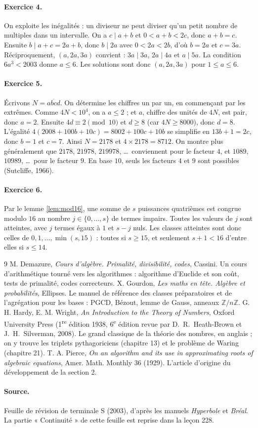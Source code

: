 \documentclass[11pt,a4paper]{article}
\theoremstyle{plain}
\theoremstyle{definition}
\theoremstyle{remark}
\newcommand{\Z}{\mathbb{Z}}
\begin{document}
\paragraph{Exercice 4.} On exploite les inégalités : un diviseur ne peut diviser qu'un petit nombre de multiples dans un intervalle. On a $c\mid a+b$ et $0<a+b<2c$, donc $a+b=c$. Ensuite $b\mid a+c=2a+b$, donc $b\mid2a$ avec $0<2a<2b$, d'où $b=2a$ et $c=3a$. Réciproquement, $(a,2a,3a)$ convient : $3a\mid3a$, $2a\mid4a$ et $a\mid5a$. La condition $6a^3<2003$ donne $a\leq6$. Les solutions sont donc $(a,2a,3a)$ pour $1\leq a\leq6$.

\paragraph{Exercice 5.} Écrivons $N=\overline{abcd}$. On détermine les chiffres un par un, en commençant par les extrêmes. Comme $4N<10^4$, on a $a\leq2$ ; et $a$, chiffre des unités de $4N$, est pair, donc $a=2$. Ensuite $4d\equiv2\pmod{10}$ et $d\geq8$ (car $4N\geq8000$), donc $d=8$. L'égalité $4(2008+100b+10c)=8002+100c+10b$ se simplifie en $13b+1=2c$, donc $b=1$ et $c=7$. Ainsi $N=2178$ et $4\times2178=8712$. On montre plus généralement que $2178$, $21978$, $219978$, \dots\ conviennent pour le facteur $4$, et $1089$, $10989$, \dots\ pour le facteur $9$. En base $10$, seuls les facteurs $4$ et $9$ sont possibles (Sutcliffe, 1966).

\paragraph{Exercice 6.} Par le lemme \ref{lem:mod16}, une somme de $s$ puissances quatrièmes est congrue modulo $16$ au nombre $j\in\{0,\dots,s\}$ de termes impairs. Toutes les valeurs de $j$ sont atteintes, avec $j$ termes égaux à $1$ et $s-j$ nuls. Les classes atteintes sont donc celles de $0,1,\dots,\min(s,15)$ : toutes si $s\geq15$, et seulement $s+1<16$ d'entre elles si $s\leq14$.

\begin{thebibliography}{9}
 M. Demazure, \emph{Cours d'algèbre. Primalité, divisibilité, codes}, Cassini. Un cours d'arithmétique tourné vers les algorithmes : algorithme d'Euclide et son coût, tests de primalité, codes correcteurs.
 X. Gourdon, \emph{Les maths en tête. Algèbre et probabilités}, Ellipses. Le manuel de référence des classes préparatoires et de l'agrégation pour les bases : PGCD, Bézout, lemme de Gauss, anneaux $\Z/n\Z$.
 G. H. Hardy, E. M. Wright, \emph{An Introduction to the Theory of Numbers}, Oxford University Press (1\textsuperscript{re} édition 1938, 6\textsuperscript{e} édition revue par D.~R.~Heath-Brown et J.~H.~Silverman, 2008). Le grand classique de la théorie des nombres, en anglais ; on y trouve les triplets pythagoriciens (chapitre 13) et le problème de Waring (chapitre 21).
 T. A. Pierce, \emph{On an algorithm and its use in approximating roots of algebraic equations}, Amer. Math. Monthly 36 (1929). L'article d'origine du développement de la section 2.
\end{thebibliography}

\paragraph{Source.} Feuille de révision de terminale S (2003), d'après les manuels \emph{Hyperbole} et \emph{Bréal}. La partie « Continuité » de cette feuille est reprise dans la leçon 228.
\end{document}
